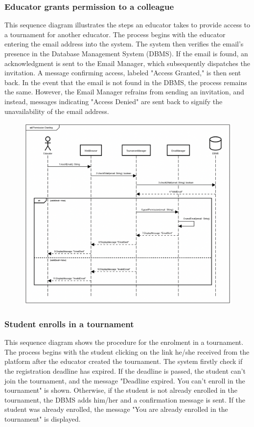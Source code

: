 \documentclass[12pt,oneside,a4paper]{article}
\begin{document}
\clearpage

\subsubsection{Educator grants permission to a colleague}
This sequence diagram illustrates the steps an educator takes to provide access to a tournament for another educator. The process begins with the educator entering the email address into the system. The system then verifies the email's presence in the Database Management System (DBMS). If the email is found, an acknowledgment is sent to the Email Manager, which subsequently dispatches the invitation. A message confirming access, labeled "Access Granted," is then sent back. In the event that the email is not found in the DBMS, the process remains the same. However, the Email Manager refrains from sending an invitation, and instead, messages indicating "Access Denied" are sent back to signify the unavailability of the email address. 


\begin{figure}[htbp]
    \centering
    \includegraphics[width=1\linewidth]{Images/Sequence Diagrams/PermissionGranting.png}
    \label{fig:enter-label}
\end{figure}

\clearpage


\subsubsection{Student enrolls in a tournament}
This sequence diagram shows the procedure for the enrolment in a tournament. The process begins with the student clicking on the link he/she received from the platform after the educator created the tournament. The system firstly check if the registration deadline has expired. If the deadline is passed, the student can't join the tournament, and the message "Deadline expired. You can't enroll in the tournament" is shown. Otherwise, if the student is not already enrolled in the tournament, the DBMS adds him/her and a confirmation message is sent. If the student was already enrolled, the message "You are already enrolled in the tournament" is displayed.  
\end{document}
